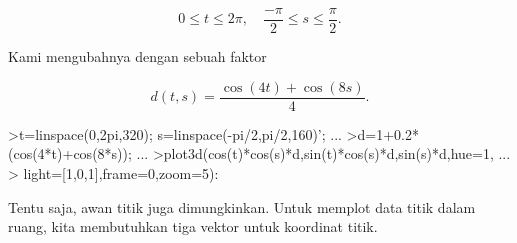 \documentclass[a4paper,10pt]{article}
\begin{document}
\begin{eulernotebook}
\begin{eulercomment}
\begin{eulercomment}
\begin{eulercomment}
\begin{eulercomment}
\begin{eulercomment}
\begin{eulercomment}
\begin{eulercomment}
\begin{eulercomment}
\begin{eulercomment}
\begin{eulercomment}
\begin{eulercomment}
\begin{eulercomment}
\begin{eulercomment}
\begin{eulercomment}
\begin{eulercomment}
\begin{eulercomment}
\begin{eulercomment}
\end{eulercomment}
\begin{eulerformula}
\[
0 \le t \le 2\pi, \quad \frac{-\pi}{2} \le s \le \frac{\pi}{2}.
\]
\end{eulerformula}
\begin{eulercomment}
Kami mengubahnya dengan sebuah faktor

\end{eulercomment}
\begin{eulerformula}
\[
d(t,s) = \frac{\cos(4t)+\cos(8s)}{4}.
\]
\end{eulerformula}
\begin{eulerprompt}
>t=linspace(0,2pi,320); s=linspace(-pi/2,pi/2,160)'; ...
>d=1+0.2*(cos(4*t)+cos(8*s)); ...
>plot3d(cos(t)*cos(s)*d,sin(t)*cos(s)*d,sin(s)*d,hue=1, ...
>  light=[1,0,1],frame=0,zoom=5):
\end{eulerprompt}
\begin{eulercomment}
Tentu saja, awan titik juga dimungkinkan. Untuk memplot data titik
dalam ruang, kita membutuhkan tiga vektor untuk koordinat titik.


\end{eulercomment}
\end{eulercomment}
\end{eulercomment}
\end{eulercomment}
\end{eulercomment}
\end{eulercomment}
\end{eulercomment}
\end{eulercomment}
\end{eulercomment}
\end{eulercomment}
\end{eulercomment}
\end{eulercomment}
\end{eulercomment}
\end{eulercomment}
\end{eulercomment}
\end{eulercomment}
\end{eulercomment}
\end{eulernotebook}
\end{document}
